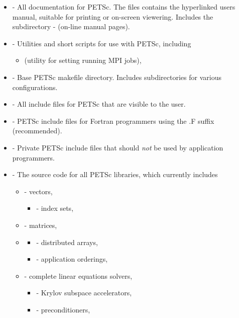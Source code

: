 \begin{itemize}
\item {} - All documentation for PETSc. The files 
                   contains the hyperlinked users manual, suitable for printing
                   or on-screen viewering. Includes the subdirectory
 \subitem -  (on-line manual pages).
\item {} - Utilities and short scripts for use with PETSc, including
 \begin{itemize}
 \item {} (utility for setting running MPI jobs),
 \end{itemize}

\item {} - Base PETSc makefile directory.  Includes subdirectories
                    for various configurations.
\item {} - All include files for PETSc that are visible to the user.
\item {}    - PETSc include files for Fortran programmers using 
                                  the .F suffix (recommended).
\item {}    - Private PETSc include files that should {\em not} 
                                  be used by application programmers.
\item {} - The source code for all PETSc libraries, which
                  currently includes
 \begin{itemize}
 \item {} - vectors,
   \begin{itemize}
     \item {} - index sets,
   \end{itemize}
 \item {} - matrices,
 \item {}
   \begin{itemize}
    \item {} - distributed arrays,
    \item {} - application orderings,
   \end{itemize}
 \item {} - complete linear equations solvers,
 \begin{itemize}
   \item {} - Krylov subspace accelerators,
   \item {} - preconditioners,
 \end{itemize}

\end{itemize}
\end{itemize}
